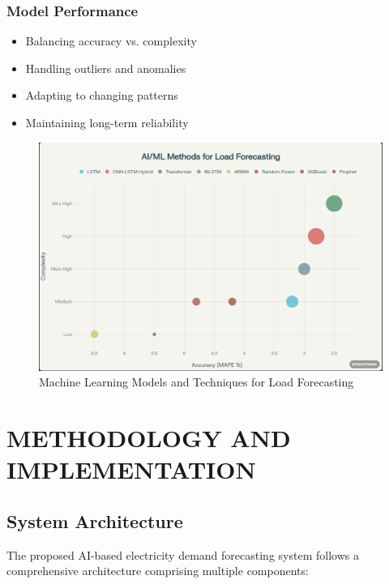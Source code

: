 \documentclass[12pt,a4paper]{report}
\begin{document}
\subsection{Model Performance}
\begin{itemize}
\item Balancing accuracy vs. complexity
\item Handling outliers and anomalies
\item Adapting to changing patterns
\item Maintaining long-term reliability
\end{itemize}

\begin{figure}[H]
    \centering
    \includegraphics[scale=0.55]{assets/ai_ml_methods_model_load_forecasting.png}
    \caption{Machine Learning Models and Techniques for Load Forecasting}
    \label{fig:ml_techniques}
\end{figure}

\chapter{METHODOLOGY AND IMPLEMENTATION}
\section{System Architecture}
The proposed AI-based electricity demand forecasting system follows a comprehensive architecture comprising multiple components:
\end{document}
